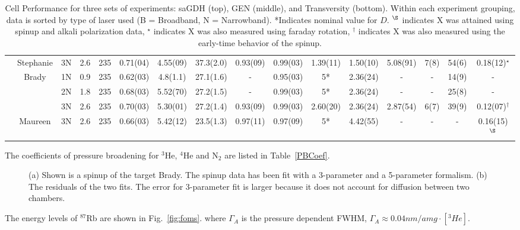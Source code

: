 \documentclass[pdftex,letterpaper,12pt]{report}
\begin{document}
\begin{table}
\begin{center}
\begin{tabular}{|c|c|ccc|ccc|ccccc|cc|c|}
			\cline{2-16}
			& Stephanie & 3N & 2.6 & 235 & 0.71(04) & 4.55(09) & 37.3(2.0) & 0.93(09) & 0.99(03) & 1.39(11) & 1.50(10) & 5.08(91) & 7(8) & 54(6) & 0.18(12)$^\star$\\
			\cline{2-16}
			& \multirow{3}{*}{Brady} & 1N & 0.9 & 235 & 0.62(03) & 4.8(1.1) & 27.1(1.6) & - & 0.95(03) & 5* & 2.36(24) & -  & - & 14(9) & -\\
			& & 2N & 1.8 & 235 & 0.68(03) & 5.52(70) & 27.2(1.5) & - & 0.99(03) & 5* & 2.36(24) & - & - & 25(8) & -\\
			& & 3N & 2.6 & 235 & 0.70(03) & 5.30(01) & 27.2(1.4) & 0.93(09) & 0.99(03) & 2.60(20) & 2.36(24) & 2.87(54) & 6(7) & 39(9) & 0.12(07)$^\dagger$\\
			\cline{2-16}
			& Maureen & 3N & 2.6 & 235 & 0.66(03) & 5.42(12) & 23.5(1.3) & 0.97(11) & 0.97(09) & 5* & 4.42(55) & - & - & - & 0.16(15)$^\S$\\
			\hline
		\end{tabular}
	\end{center}
	\caption{Cell Performance for three sets of experiments: saGDH (top), GEN (middle), and Transversity (bottom).  Within each experiment grouping, data is sorted by type of laser used (B = Broadband, N = Narrowband).  *Indicates nominal value for $D$.  $^\S$ indicates X was attained using spinup and alkali polarization data, $^\star$ indicates X was also measured using faraday rotation, $^\dagger$ indicates X was also measured using the early-time behavior of the spinup.}
	\label{table:CellTable}
\end{table}

The coefficients of pressure broadening for $^{3}$He, $^{4}$He and N$_{2}$ are listed in Table~\ref{PBCoef}.

\begin{figure}[t!]
	\label{spinup}
	\centering
	\caption{{(a) Shown is a spinup of the target Brady. The spinup data has been fit with a 3-parameter and a 5-parameter formalism. (b) The residuals of the two fits. The error for 3-parameter fit is larger because it does not account for diffusion between two chambers.}}
\end{figure}

The energy levels of $^{87}$Rb are shown in Fig.~\ref{fig:foms}.
where $\Gamma_{A}$ is the pressure dependent FWHM, $\Gamma_{A}\approx 0.04nm/amg \cdot [^{3}He]$.


\end{document}
